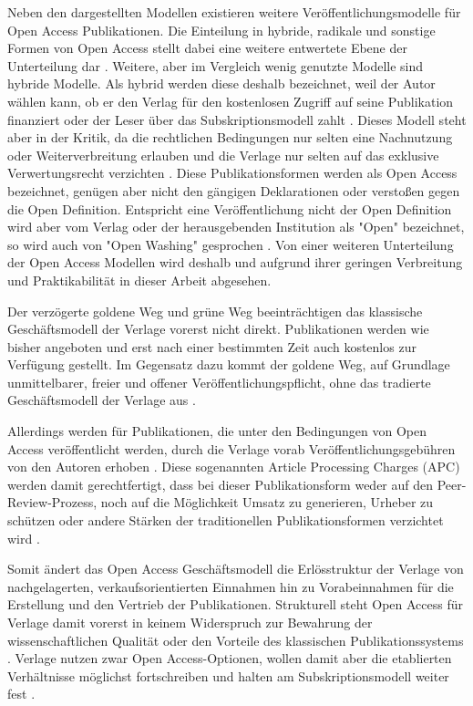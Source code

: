 Neben den dargestellten Modellen existieren weitere Veröffentlichungsmodelle für Open Access Publikationen. Die Einteilung in hybride, radikale und sonstige Formen von Open Access stellt dabei eine weitere entwertete Ebene der Unterteilung dar \cite{Mounce_2015}. Weitere, aber im Vergleich wenig genutzte Modelle sind hybride Modelle. Als hybrid werden diese deshalb bezeichnet, weil der Autor wählen kann, ob er den Verlag für den kostenlosen Zugriff auf seine Publikation finanziert oder der Leser über das Subskriptionsmodell zahlt \cite{muller_2010_open}. Dieses Modell steht aber in der Kritik, da die rechtlichen Bedingungen nur selten eine Nachnutzung oder Weiterverbreitung erlauben und die Verlage nur selten auf das exklusive Verwertungsrecht verzichten \cite{muller_2010_open}. Diese Publikationsformen werden als Open Access bezeichnet, genügen aber nicht den gängigen Deklarationen \cite{boai_2012} oder verstoßen gegen die Open Definition. Entspricht eine Veröffentlichung nicht der Open Definition wird aber vom Verlag oder der herausgebenden Institution als "Open" bezeichnet, so wird auch von "Open Washing" gesprochen \cite{suchen}. Von einer weiteren Unterteilung der Open Access Modellen wird deshalb und aufgrund ihrer geringen Verbreitung und Praktikabilität in dieser Arbeit abgesehen.

Der verzögerte goldene Weg und grüne Weg beeinträchtigen das klassische Geschäftsmodell der Verlage vorerst nicht direkt. Publikationen werden wie bisher angeboten und erst nach einer bestimmten Zeit auch kostenlos zur Verfügung gestellt. Im Gegensatz dazu kommt der goldene Weg, auf Grundlage unmittelbarer, freier und offener Veröffentlichungspflicht, ohne das tradierte Geschäftsmodell der Verlage aus \cite{lewis_2012_inevitability}.

Allerdings werden für Publikationen, die unter den Bedingungen von Open Access veröffentlicht werden, durch die Verlage vorab Veröffentlichungsgebühren von den Autoren erhoben \cite{suchen}. Diese sogenannten Article Processing Charges (APC) werden damit gerechtfertigt, dass bei dieser Publikationsform weder auf den Peer-Review-Prozess, noch auf die Möglichkeit Umsatz zu generieren, Urheber zu schützen oder andere Stärken der traditionellen Publikationsformen verzichtet wird \cite{albert_2006_open_implications} \cite{Open_Access_net_2009}.

Somit ändert das Open Access Geschäftsmodell die Erlösstruktur der Verlage von nachgelagerten, verkaufsorientierten Einnahmen hin zu Vorabeinnahmen für die Erstellung und den Vertrieb der Publikationen. Strukturell steht Open Access für Verlage damit vorerst in keinem Widerspruch zur Bewahrung der wissenschaftlichen Qualität oder den Vorteile des klassischen Publikationssystems \cite{Suber_2002}. Verlage nutzen zwar Open Access-Optionen, wollen damit aber die etablierten Verhältnisse möglichst fortschreiben und halten am Subskriptionsmodell weiter fest \cite{schmidt_2007_goldenen}.

